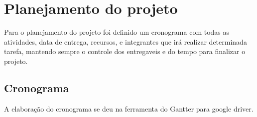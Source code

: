 \chapter{Planejamento do projeto}

  Para o planejamento do projeto foi definido um cronograma com todas as atividades, data de entrega, recursos, e integrantes que irá
  realizar determinada tarefa, mantendo sempre o controle dos entregaveis e do tempo para finalizar o projeto.

\section{Cronograma}

  A elaboração do cronograma se deu na ferramenta do Gantter para google driver.